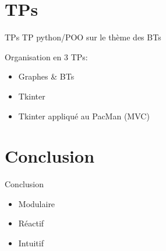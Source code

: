 \documentclass[presentation]{beamer}
\begin{document}
\section{TPs}
\label{sec-4}
\begin{frame}[label=sec-4-0-1]{TPs}
TP python/POO sur le thème des BTs 

Organisation en 3 TPs:
\begin{itemize}
\item Graphes \& BTs
\item Tkinter
\item Tkinter appliqué au PacMan (MVC)
\end{itemize}
\end{frame}

\section{Conclusion}
\label{sec-5}
\begin{frame}[label=sec-5-0-1]{Conclusion}
\begin{itemize}
\item Modulaire
\item Réactif
\item Intuitif
\end{itemize}
\end{frame}
\end{document}
